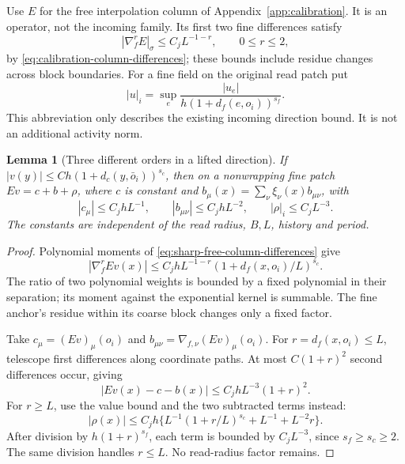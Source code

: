 \documentclass[11pt,reqno]{amsart}
\numberwithin{equation}{section}
\newtheorem{lemma}[theorem]{Lemma}
\theoremstyle{definition}
\theoremstyle{remark}
\begin{document}
Use \(E\) for the free interpolation column of
Appendix~\ref{app:calibration}. It is an operator, not the
incoming family. Its first two fine differences satisfy
\begin{equation}
 |\nabla_f^rE|_\sigma\le C_jL^{-1-r},\qquad 0\le r\le2,
 \label{eq:sharp-free-column-differences}
\end{equation}
by \eqref{eq:calibration-column-differences}; these bounds
include residue changes across block boundaries. For a fine
field on the original read patch put
\[
             |u|_i=\sup_e
               \frac{|u_e|}{h(1+d_f(e,o_i))^{s_f}}.
\]
This abbreviation only describes the existing incoming
direction bound. It is not an additional activity norm.

\begin{lemma}[Three different orders in a lifted direction]
\label{lem:sharp-three-parts}
If \(|v(y)|\le Ch(1+d_c(y,\bar o_i))^{s_c}\), then on a
nonwrapping fine patch
\(Ev=c+b+\rho\), where \(c\) is constant and
\(b_\mu(x)=\sum_\nu\xi_\nu(x)b_{\mu\nu}\), with
\begin{equation}
 |c_\mu|\le C_jhL^{-1},\qquad
 |b_{\mu\nu}|\le C_jhL^{-2},\qquad
                         |\rho|_i\le C_jL^{-3}.
 \label{eq:sharp-three-parts}
\end{equation}
The constants are independent of the read radius, \(B,L\),
history and period.
\end{lemma}
\begin{proof}
Polynomial moments of
\eqref{eq:sharp-free-column-differences} give
\[
 |\nabla_f^rEv(x)|\le C_jhL^{-1-r}
                    (1+d_f(x,o_i)/L)^{s_c}.
\]
The ratio of two polynomial weights is bounded by a fixed
polynomial in their separation; its moment against the
exponential kernel is summable. The fine anchor's residue
within its coarse block changes only a fixed factor.

Take \(c_\mu=(Ev)_\mu(o_i)\) and
\(b_{\mu\nu}=\nabla_{f,\nu}(Ev)_\mu(o_i)\).
For \(r=d_f(x,o_i)\le L\), telescope first differences
along coordinate paths. At most \(C(1+r)^2\) second
differences occur, giving
\[
              |Ev(x)-c-b(x)|\le C_jhL^{-3}(1+r)^2.
\]
For \(r\ge L\), use the value bound and the two subtracted
terms instead:
\[
 |\rho(x)|\le C_jh\{L^{-1}(1+r/L)^{s_c}
                                      +L^{-1}+L^{-2}r\}.
\]
After division by \(h(1+r)^{s_f}\), each term is bounded
by \(C_jL^{-3}\), since \(s_f\ge s_c\ge2\). The same
division handles \(r\le L\). No read-radius factor remains.
\end{proof}
\end{document}
